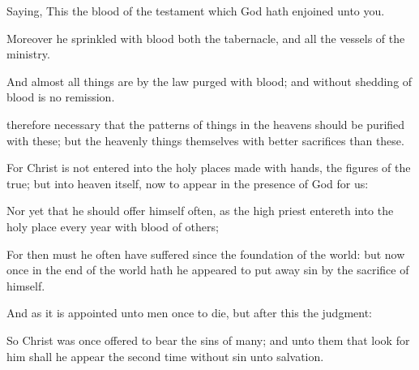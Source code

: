 {Saying,
This
{} the
blood of the
testament
which
God hath
enjoined
unto
you.

Moreover he
sprinkled with
blood
both the
tabernacle,
and
all the
vessels of the
ministry.

And
almost all
things
are
by the
law
purged
with
blood;
and
without shedding of
blood
is
no
remission.

therefore necessary
that the
patterns of
things
in the
heavens should be
purified with
these;
but the heavenly
things
themselves
with
better
sacrifices
than
these.

For
Christ
is
not
entered
into the holy
places made with
hands,
{} the
figures of the
true;
but
into
heaven
itself,
now to
appear in the
presence of
God
for
us:

Nor
yet
that he should
offer
himself
often,
as the high
priest
entereth
into the holy
place
every
year
with
blood of
others;

For
then
must
he
often have
suffered
since the
foundation of the
world:
but
now
once
in the
end of the
world hath he
appeared
to put
away
sin
by the
sacrifice of
himself.

And
as it is
appointed unto
men
once to
die,
but
after
this the
judgment:

So
Christ
was
once
offered
to
bear the
sins of
many; and unto them that look
for
him shall he
appear the second
time
without
sin
unto
salvation.




\par }
